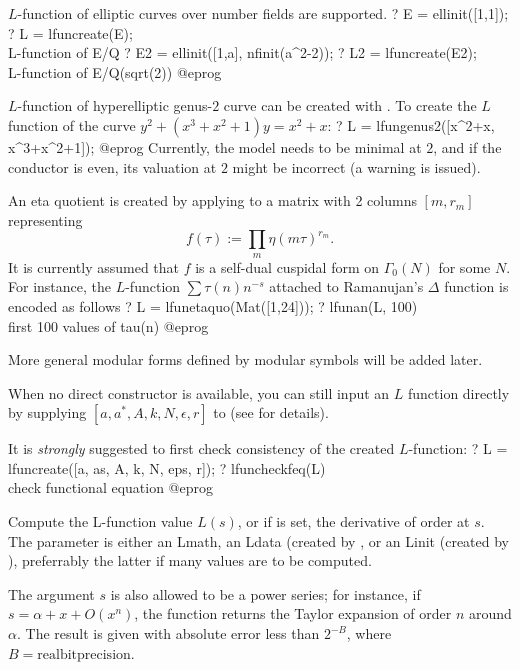
$L$-function of elliptic curves over number fields are supported.
\bprog
? E = ellinit([1,1]);
? L = lfuncreate(E);  \\ L-function of E/Q
? E2 = ellinit([1,a], nfinit(a^2-2));
? L2 = lfuncreate(E2);  \\ L-function of E/Q(sqrt(2))
@eprog

$L$-function of hyperelliptic genus-$2$ curve can be created with
. To create the $L$ function of the curve
$y^2+(x^3+x^2+1)y = x^2+x$:
\bprog
? L = lfungenus2([x^2+x, x^3+x^2+1]);
@eprog
Currently, the model needs to be minimal at $2$, and if the conductor is even,
its valuation at $2$ might be incorrect (a warning is issued).


An eta quotient is created by applying  to a matrix with
2 columns $[m, r_m]$ representing
$$ f(\tau) := \prod_m \eta(m\tau)^{r_m}. $$
It is currently assumed that $f$ is a self-dual cuspidal form on
$\Gamma_0(N)$ for some $N$.
For instance, the $L$-function $\sum \tau(n) n^{-s}$
attached to Ramanujan's $\Delta$ function is encoded as follows
\bprog
? L = lfunetaquo(Mat([1,24]));
? lfunan(L, 100)  \\ first 100 values of tau(n)
@eprog

More general modular forms defined by modular symbols will be added later.


When no direct constructor is available, you can still input an $L$ function
directly by supplying $[a, a^*,A, k, N, \epsilon, r]$ to 
(see  for details).

It is \emph{strongly} suggested to first check consistency of the created
$L$-function:
\bprog
? L = lfuncreate([a, as, A, k, N, eps, r]);
? lfuncheckfeq(L)  \\ check functional equation
@eprog


\label{se:lfun}
Compute the L-function value $L(s)$, or if  is set, the
derivative of order  at $s$. The parameter
 is either an Lmath, an Ldata (created by , or an
Linit (created by ), preferrably the latter if many values
are to be computed.

The argument $s$ is also allowed to be a power series; for instance, if $s =
\alpha + x + O(x^n)$, the function returns the Taylor expansion of order $n$
around $\alpha$. The result is given with absolute error less than $2^{-B}$,
where $B = \text{realbitprecision}$.

